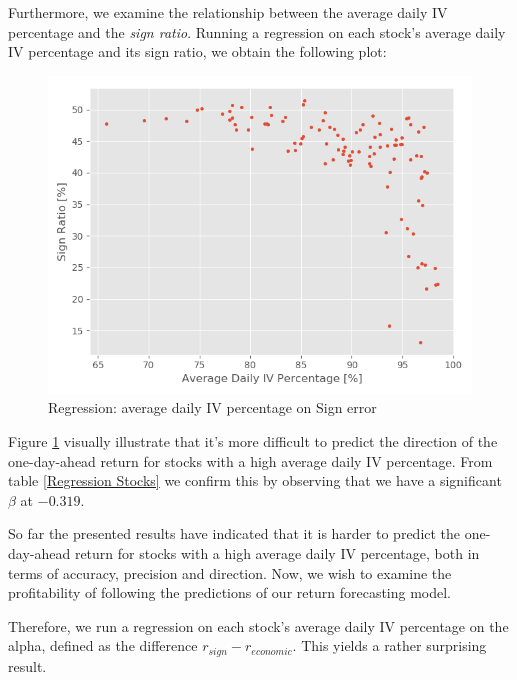 Furthermore, we examine the relationship between the average daily IV percentage and the \textit{sign ratio}. Running a regression on each stock's average daily IV percentage and its sign ratio, we obtain the following plot: 

\begin{figure}[h]
    \centering
    \includegraphics[scale = 0.5]{Plot/IndividualStockRegression1.png}
    \caption{Regression: average daily IV percentage on Sign error}
    \label{IVSignError}
\end{figure}

Figure \ref{IVSignError} visually illustrate that it's more difficult to predict the direction of the one-day-ahead return for stocks with a high average daily IV percentage. From table \ref{Regression Stocks} we confirm this by observing that we have a significant $\beta$ at $-0.319$.

So far the presented results have indicated that it is harder to predict the one-day-ahead return for stocks with a high average daily IV percentage, both in terms of accuracy, precision and direction. Now, we wish to examine the profitability of following the predictions of our return forecasting model. 

Therefore, we run a regression on each stock’s average daily IV percentage on the alpha, defined as the difference $r_{sign}-r_{economic}$. This yields a rather surprising result.

